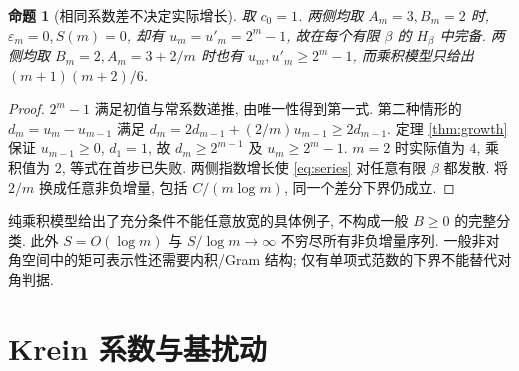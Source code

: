 \documentclass[UTF8]{ctexart}
\newtheorem{proposition}[theorem]{命题}
\begin{document}
\begin{proposition}[相同系数差不决定实际增长]\label{prop:counter-recurrence}
取 $c_0=1$. 两侧均取 $A_m=3,B_m=2$ 时,
$\varepsilon_m=0,S(m)=0$, 却有
$u_m=u'_m=2^m-1$, 故在每个有限 $\beta$ 的 $H_\beta$ 中完备.
两侧均取 $B_m=2,A_m=3+2/m$ 时也有 $u_m,u'_m\ge2^m-1$,
而乘积模型只给出 $(m+1)(m+2)/6$.
\end{proposition}
\begin{proof}
$2^m-1$ 满足初值与常系数递推, 由唯一性得到第一式.
第二种情形的 $d_m=u_m-u_{m-1}$ 满足
$d_m=2d_{m-1}+(2/m)u_{m-1}\ge2d_{m-1}$.
定理 \ref{thm:growth} 保证 $u_{m-1}\ge0$, $d_1=1$,
故 $d_m\ge2^{m-1}$ 及 $u_m\ge2^m-1$.
$m=2$ 时实际值为 $4$, 乘积值为 $2$, 等式在首步已失败.
两侧指数增长使 \eqref{eq:series} 对任意有限 $\beta$ 都发散.
将 $2/m$ 换成任意非负增量, 包括 $C/(m\log m)$,
同一个差分下界仍成立.
\end{proof}

纯乘积模型给出了充分条件不能任意放宽的具体例子,
不构成一般 $B\ge0$ 的完整分类.
此外 $S=O(\log m)$ 与 $S/\log m\to\infty$ 不穷尽所有非负增量序列.
一般非对角空间中的矩可表示性还需要内积/Gram 结构;
仅有单项式范数的下界不能替代对角判据.

\section{Krein 系数与基扰动}
\end{document}
